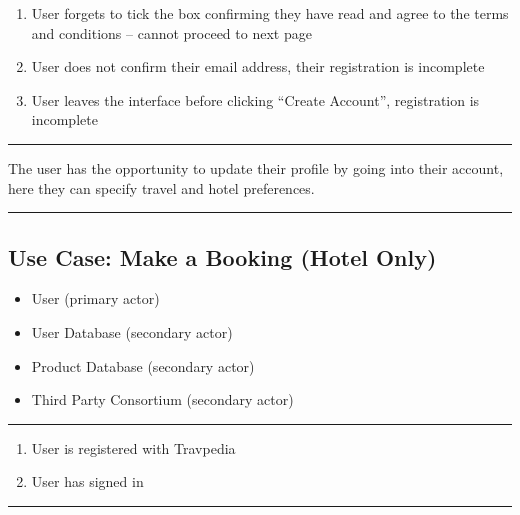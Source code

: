 \begin{enumerate}
	\item User forgets to tick the box confirming they have read and agree
		to the terms and conditions – cannot proceed to next page
	\item User does not confirm their email address, their registration is
		incomplete
	\item User leaves the interface before clicking ``Create Account'',
		registration is incomplete
\end{enumerate}
\noindent\rule{\textwidth}{0.6pt}

The user has the opportunity to update their profile by going into their
account, here they can specify travel and hotel preferences.

\noindent\rule{\textwidth}{0.6pt}

\vspace{4ex}
\hspace{-4.2cm}
\begin{minipage}[h][][s]{\linewidth}
	\subsection{Use Case: Make a Booking (Hotel Only)}
\end{minipage}

\begin{itemize}
	\item User (primary actor)
	\item User Database  (secondary actor)
	\item Product Database  (secondary actor)
	\item Third Party Consortium (secondary actor)
\end{itemize}
\noindent\rule{\textwidth}{0.6pt}

\begin{enumerate}
	\item User is registered with Travpedia
	\item User has signed in
\end{enumerate}
\noindent\rule{\textwidth}{0.6pt}

